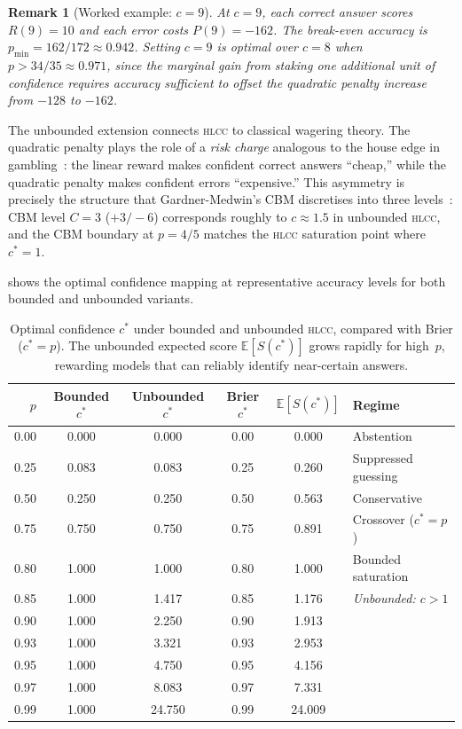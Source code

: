 \documentclass[11pt,a4paper]{article}
\newtheorem{remark}{Remark}
\newcommand{\hlcc}{\textsc{hlcc}}
\newcommand{\E}{\mathbb{E}}
\newcommand{\cstar}{c^{*}}
\begin{document}
\begin{remark}[Worked example: $c = 9$]
  At $c = 9$, each correct answer scores $R(9) = 10$ and each error
  costs $P(9) = -162$.  The break-even accuracy is
  $p_{\min} = 162/172 \approx 0.942$.
  Setting $c = 9$ is optimal over $c = 8$ when
  $p > 34/35 \approx 0.971$, since the marginal gain from staking one
  additional unit of confidence requires accuracy sufficient to offset
  the quadratic penalty increase from $-128$ to $-162$.
\end{remark}

The unbounded extension connects \hlcc{} to classical
wagering theory.  The quadratic penalty plays the role of a
\emph{risk charge} analogous to the house edge in
gambling~\cite{kelly1956}: the linear reward makes confident correct
answers ``cheap,'' while the quadratic penalty makes confident errors
``expensive.''  This asymmetry is precisely the structure that
Gardner-Medwin's CBM discretises into three levels~\cite{gardnermedwin2006}:
CBM level $C{=}3$ ($+3/{-}6$) corresponds roughly to $c \approx 1.5$
in unbounded \hlcc{}, and the CBM boundary at $p = 4/5$ matches the
\hlcc{} saturation point where $\cstar = 1$.

 shows the optimal confidence mapping at
representative accuracy levels for both bounded and unbounded variants.

\begin{table}[t]
\centering
\caption{Optimal confidence $\cstar$ under bounded and unbounded \hlcc{},
         compared with Brier ($\cstar = p$).  The unbounded
         expected score $\E[S(\cstar)]$ grows rapidly for high~$p$,
         rewarding models that can reliably identify near-certain answers.}
\label{tab:rational-confidence}
\begin{tabular}{@{}rccccl@{}}
\toprule
$p$ & Bounded $\cstar$ & Unbounded $\cstar$ & Brier $\cstar$
    & $\E[S(\cstar)]$ & Regime \\
\midrule
0.00 & 0.000 & 0.000 & 0.00 & 0.000 & Abstention \\
0.25 & 0.083 & 0.083 & 0.25 & 0.260 & Suppressed guessing \\
0.50 & 0.250 & 0.250 & 0.50 & 0.563 & Conservative \\
0.75 & 0.750 & 0.750 & 0.75 & 0.891 & Crossover ($\cstar = p$) \\
0.80 & 1.000 & 1.000 & 0.80 & 1.000 & Bounded saturation \\
\midrule
0.85 & 1.000 & 1.417 & 0.85 & 1.176 & \textit{Unbounded: $c > 1$} \\
0.90 & 1.000 & 2.250 & 0.90 & 1.913 & \\
0.93 & 1.000 & 3.321 & 0.93 & 2.953 & \\
0.95 & 1.000 & 4.750 & 0.95 & 4.156 & \\
0.97 & 1.000 & 8.083 & 0.97 & 7.331 & \\
0.99 & 1.000 & 24.750 & 0.99 & 24.009 & \\
\bottomrule
\end{tabular}
\end{table}
\end{document}
